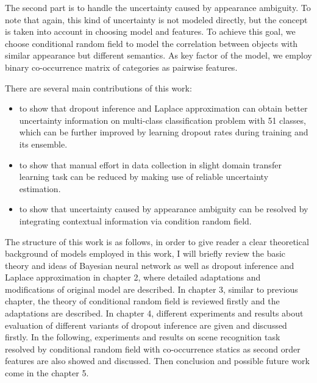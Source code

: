 The second part is to handle the uncertainty caused by appearance ambiguity. To note that again, this kind of uncertainty is not modeled directly, but the concept is taken into account in choosing model and features. To achieve this goal, we choose conditional random field to model the correlation between objects with similar appearance but different semantics. As key factor of the model, we employ binary co-occurrence matrix of categories as pairwise features.

There are several main contributions of this work:
\begin{itemize}
 \item to show that dropout inference and Laplace approximation can obtain better uncertainty information on multi-class classification problem with 51 classes, which can be further improved by learning dropout rates during training and its ensemble.
 
 \item to show that manual effort in data collection in slight domain transfer learning task can be reduced by making use of reliable uncertainty estimation.
 
 \item to show that uncertainty caused by appearance ambiguity can be resolved by integrating contextual information via condition random field.
 
 
\end{itemize}

The structure of this work is as follows, in order to give reader a clear theoretical background of models employed in this work, I will briefly review the basic theory and ideas of Bayesian neural network as well as dropout inference and Laplace approximation in chapter 2, where detailed adaptations and modifications of original model are described. In chapter 3, similar to previous chapter, the theory of conditional random field is reviewed firstly and the adaptations are described. In chapter 4, different experiments and results about evaluation of different variants of dropout inference are given and discussed firstly. In the following, experiments and results on scene recognition task resolved by conditional random field with co-occurrence statics as second order features are also showed and discussed. Then conclusion and possible future work come in the chapter 5.